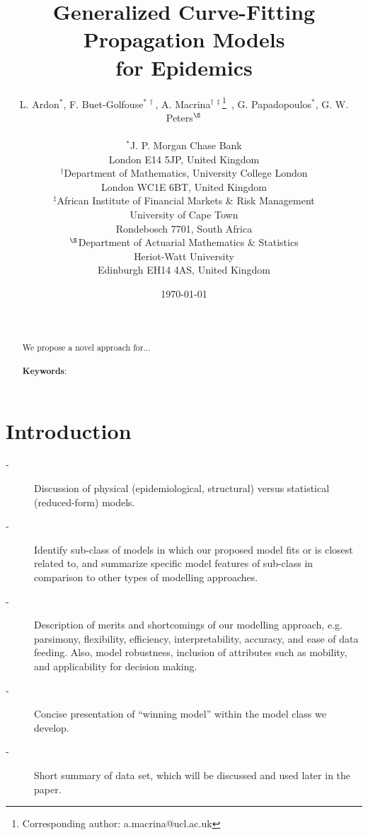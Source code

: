 \documentclass[11pt,a4paper,amssymb,amsmath, tightenlines]{article}
\numberwithin{equation}{section}
\begin{document}
\title{\vspace{-2cm}\bf Generalized Curve-Fitting Propagation Models \\ for Epidemics}
\author{L. Ardon$^{\ast}$, F. Buet-Golfouse{$^{\ast\,\dag}$}, A. Macrina{$^{\dag\, \ddag}$\footnote{Corresponding author: a.macrina@ucl.ac.uk}\ }, G. Papadopoulos$^{\ast}$, G. W. Peters{$^{\S}$} \\ \\ {$^{\ast}$J. P. Morgan Chase Bank} \\ {London E14 5JP, United Kingdom} \\ {$^{\dag}$Department of Mathematics, University College London} \\ {London WC1E 6BT, United Kingdom} \\ {$^{\ddag}$African Institute of Financial Markets \& Risk Management} \\ {University of Cape Town} \\ {Rondebosch 7701, South Africa} \\ {$^{\S}$}Department of Actuarial Mathematics \& Statistics \\ Heriot-Watt University \\ Edinburgh EH14 4AS, United Kingdom}
\date{\today 
}
\maketitle
\vspace{-1cm}
\begin{abstract}
\noindent 
\\\vspace{-1cm}\\
We propose a novel approach for... 
\\
\\
{\bf Keywords}: 
\\\vspace{-0.5cm}
\end{abstract}
\section{Introduction}
\begin{description}
	\item[-] Discussion of physical (epidemiological, structural) versus statistical (reduced-form) models. 
	\item[-] Identify sub-class of models in which our proposed model fits or is closest related to, and summarize specific model features of sub-class in comparison to other types of modelling approaches. 
	\item[-]Description of merits and shortcomings of our modelling approach, e.g. parsimony, flexibility, efficiency, interpretability, accuracy, and ease of data feeding. Also, model robustness, inclusion of attributes such as mobility, and applicability for decision making.
	\item[-] Concise presentation of ``winning model'' within the model class we develop.
	\item[-] Short summary of data set, which will be discussed and used later in the paper.
\end{description}
\end{document}
